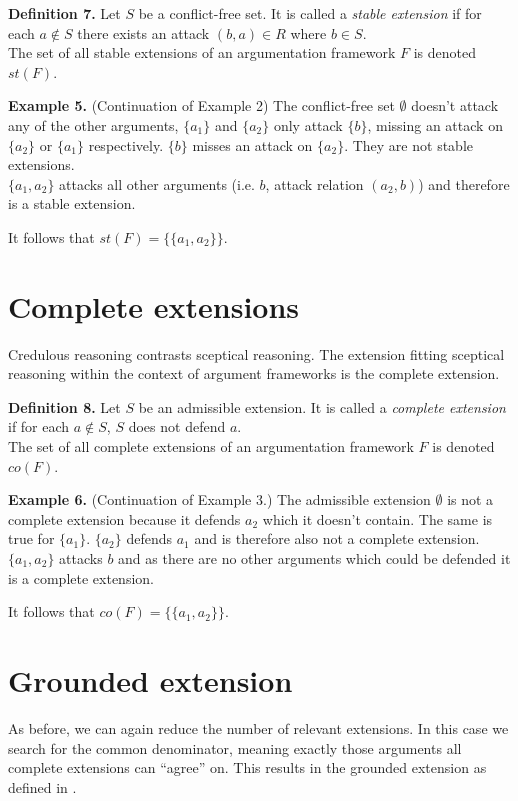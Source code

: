 \documentclass[draft,final]{vutinfth} %
\newcommand{\hl}{\par\vspace{6pt}} %
\newcommand{\cl}{\par\vspace{12pt}} %
\begin{document}
\textbf{Definition 7.} Let $S$ be a conflict-free set. It is called a \emph{stable extension} if for each $a\not\in S$ there exists an attack $(b,a)\in R$ where $b\in S$.\\
The set of all stable extensions of an argumentation framework $F$ is denoted $st(F)$.\cl

\textbf{Example 5.} (Continuation of Example 2) The conflict-free set $\emptyset$ doesn't attack any of the other arguments, $\{a_1\}$ and $\{a_2\}$ only attack $\{b\}$, missing an attack on $\{a_2\}$ or $\{a_1\}$ respectively. $\{b\}$ misses an attack on $\{a_2\}$. They are not stable extensions.\\
$\{a_1,a_2\}$ attacks all other arguments (i.e. $b$, attack relation $(a_2,b)$) and therefore is a stable extension.\hl
It follows that $st(F)=\{\{a_1,a_2\}\}$.\cl

\section{Complete extensions}

Credulous reasoning contrasts sceptical reasoning. The extension fitting sceptical reasoning within the context of argument frameworks is the complete extension.\cl

\textbf{Definition 8.} Let $S$ be an admissible extension. It is called a \emph{complete extension} if for each $a\not\in S$, $S$ does not defend $a$.\\
The set of all complete extensions of an argumentation framework $F$ is denoted $co(F)$.\cl

\textbf{Example 6.} (Continuation of Example 3.) The admissible extension $\emptyset$ is not a complete extension because it defends $a_2$ which it doesn't contain. The same is true for $\{a_1\}$. $\{a_2\}$ defends $a_1$ and is therefore also not a complete extension.\\
$\{a_1,a_2\}$ attacks $b$ and as there are no other arguments which could be defended it is a complete extension.\hl
It follows that $co(F)=\{\{a_1,a_2\}\}$.\cl

\section{Grounded extension}

As before, we can again reduce the number of relevant extensions. In this case we search for the common denominator, meaning exactly those arguments all complete extensions can ``agree'' on. This results in the grounded extension as defined in \cite{Egly}.\cl
\end{document}
